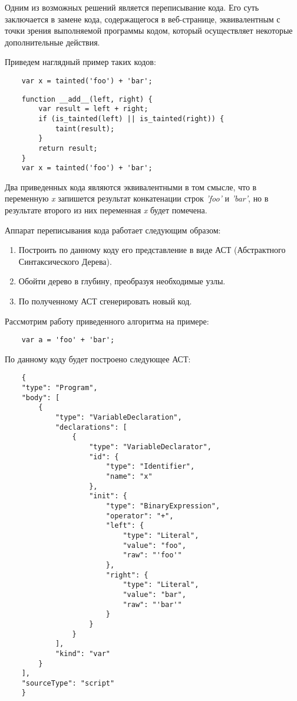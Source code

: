 Одним из возможных решений является переписывание кода. Его суть заключается в замене кода, содержащегося в веб-странице, эквивалентным с точки зрения выполняемой программы кодом, который осуществляет некоторые дополнительные действия.


Приведем наглядный пример таких кодов:

\bigskip
\begin{lstlisting}
	var x = tainted('foo') + 'bar';
\end{lstlisting}


\begin{lstlisting}
	function __add__(left, right) {
		var result = left + right;
		if (is_tainted(left) || is_tainted(right)) {
			taint(result);
		}
		return result;
	}
	var x = tainted('foo') + 'bar';
\end{lstlisting}


Два приведенных кода являются эквивалентными в том смысле, что в переменную \textit{x} запишется результат конкатенации строк \textit{'foo'} и \textit{'bar'}, но в результате второго из них переменная \textit{x} будет помечена.


Аппарат переписывания кода работает следующим образом:


\begin{enumerate}
	\item Построить по данному коду его представление в виде АСТ (Абстрактного Синтаксического Дерева).
	\item Обойти дерево в глубину, преобразуя необходимые узлы.
	\item По полученному АСТ сгенерировать новый код.
\end{enumerate}


Рассмотрим работу приведенного алгоритма на примере:

\bigskip
\begin{lstlisting}
	var a = 'foo' + 'bar';
\end{lstlisting}


По данному коду будет построено следующее АСТ:

\bigskip
\begin{lstlisting}
	{
    "type": "Program",
    "body": [
        {
            "type": "VariableDeclaration",
            "declarations": [
                {
                    "type": "VariableDeclarator",
                    "id": {
                        "type": "Identifier",
                        "name": "x"
                    },
                    "init": {
                        "type": "BinaryExpression",
                        "operator": "+",
                        "left": {
                            "type": "Literal",
                            "value": "foo",
                            "raw": "'foo'"
                        },
                        "right": {
                            "type": "Literal",
                            "value": "bar",
                            "raw": "'bar'"
                        }
                    }
                }
            ],
            "kind": "var"
        }
    ],
    "sourceType": "script"
	}
\end{lstlisting}


